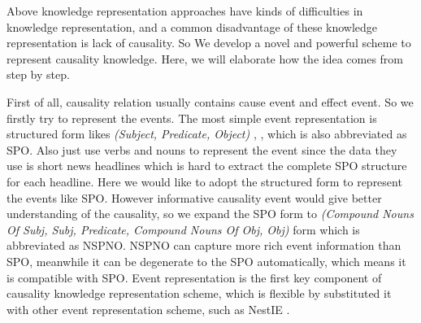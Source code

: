 Above  knowledge representation approaches have kinds of difficulties in  knowledge  representation, and a common disadvantage of these knowledge representation is lack of causality. So We develop a novel and powerful scheme to represent causality knowledge. Here, we will elaborate how the idea comes from step by step.   


First of all, causality relation usually contains cause event and effect event. So we firstly try to represent the events. The most simple event representation is structured form likes \textit{(Subject, Predicate, Object)} \cite{ding2015deep}, \cite{ding2016knowledge}, which is also abbreviated as SPO. Also \citeauthor{zhao2017constructing} just use verbs and nouns to represent the event since the data they use is short news headlines which is hard to extract the complete SPO structure for each headline. Here we would like to adopt the structured form to represent the events like SPO. However informative causality event would give better understanding of the causality, so we expand the SPO form to \textit{(Compound Nouns Of Subj, Subj, Predicate, Compound Nouns Of Obj, Obj)} form which is abbreviated as NSPNO. NSPNO can capture more rich event information than SPO, meanwhile it can be degenerate to the SPO automatically, which means it is compatible with SPO. Event representation is the first key component of causality knowledge representation scheme, which is flexible by substituted it with other event representation scheme, such as NestIE \citeauthor{bhutani2016nested}.

